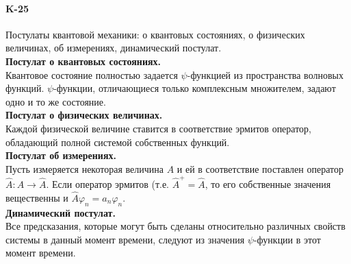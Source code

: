 \documentclass[__main__.tex]{subfiles}
\begin{document}
\paragraph{K-25}
Постулаты квантовой механики: о квантовых состояниях, о физических величинах, об измерениях, динамический постулат.\\

\textbf{Постулат о квантовых состояниях.}\\
Квантовое состояние полностью задается $\psi$-функцией из пространства волновых функций. $\psi$-функции, отличающиеся только комплексным множителем, задают одно и то же состояние.\\

\textbf{Постулат о физических величинах.}\\
Каждой физической величине ставится в соответствие эрмитов оператор, обладающий полной системой собственных функций.\\

\textbf{Постулат об измерениях.}\\
Пусть измеряется некоторая величина $A$ и ей в соответствие поставлен оператор $\hat{A}: A \rightarrow \hat{A}$. Если оператор эрмитов (т.е. $\hat{A}^{+}=\hat{A}$, то его собственные значения вещественны и $\hat{A}\varphi_n=a_n\varphi_n$.\\

\textbf{Динамический постулат.}\\
Все предсказания, которые могут быть сделаны относительно различных свойств системы в данный момент времени, следуют из значения $\psi$-функции в этот момент времени.\\
\end{document}

